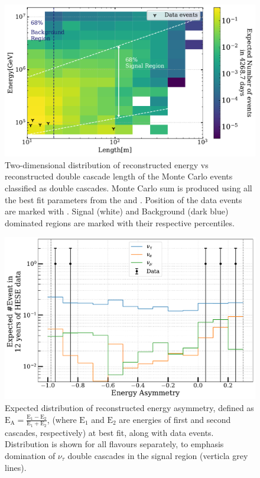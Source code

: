 \begin{figure}[h]
    
    \includegraphics{./figures/results/DataMC_IC86_pass2_SnowStorm_v2_Bfr_DoubleCascadesLvsE_2D_withData.pdf}
    
    
    \caption[Two dimensional PDF of length vs Energy of double cascade sample at best fit showing data events positions]{Two-dimensional distribution of reconstructed energy vs reconstructed double cascade length of the Monte Carlo events classified as double cascades. Monte Carlo sum is produced using all the best fit parameters from the  and . Position of the data events are marked with \wye[rotate=180]. Signal (white) and Background (dark blue) dominated regions are marked with their respective percentiles.}
\end{figure}

\begin{figure}
    
    \includegraphics{./figures/results/Energy_ratio.pdf}
    
    \caption[Data/MC distribution of Energy asymmetry in double cascade sample]{Expected distribution of reconstructed energy asymmetry, defined as $\mathrm{E}_{\mathrm{A}}=\frac{\mathrm{E}_1-\mathrm{E}_2}{\mathrm{E}_1+\mathrm{E}_2}$, (where $\mathrm{E}_1$ and $\mathrm{E}_2$ are energies of first and second cascades, respectively) at best fit, along with data events. Distribution is shown for all flavours separately, to emphasis domination of $\nu_{\tau}$ double cascades in the signal region (verticla grey lines).}
\end{figure}

